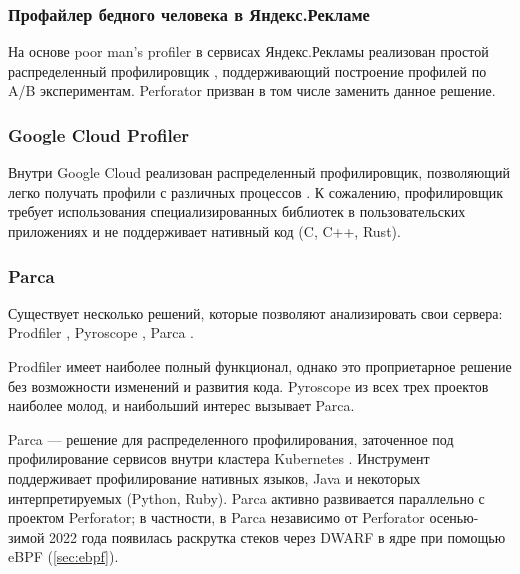 \subsubsection{Профайлер бедного человека в Яндекс.Рекламе}
На основе poor man's profiler в сервисах Яндекс.Рекламы реализован простой распределенный профилировщик \cite{pmp:yabs}, поддерживающий
построение профилей по A/B экспериментам.
Perforator призван в том числе заменить данное решение.

\subsubsection{Google Cloud Profiler}
Внутри Google Cloud реализован распределенный профилировщик, позволяющий легко получать профили с различных процессов \cite{gcp}.
К сожалению, профилировщик требует использования специализированных библиотек в пользовательских приложениях
и не поддерживает нативный код (C, C++, Rust).

\subsubsection{Parca}
Существует несколько решений, которые позволяют анализировать свои сервера:
Prodfiler \cite{prodfiler}, Pyroscope \cite{pyroscope}, Parca \cite{parca}.

Prodfiler имеет наиболее полный функционал, однако это проприетарное решение без возможности изменений и развития кода.
Pyroscope из всех трех проектов наиболее молод, и наибольший интерес вызывает Parca.

Parca --- решение для распределенного профилирования, заточенное под профилирование сервисов внутри кластера Kubernetes \cite{kubernetes}.
Инструмент поддерживает профилирование нативных языков, Java и некоторых интерпретируемых (Python, Ruby).
Parca активно развивается параллельно с проектом Perforator;
в частности, в Parca независимо от Perforator осенью-зимой 2022 года
появилась раскрутка стеков через DWARF в ядре при помощью eBPF (\ref{sec:ebpf}).


